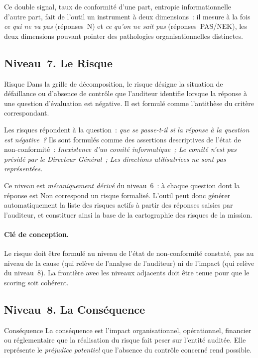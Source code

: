 Ce double signal, taux de conformité d'une part, entropie informationnelle
d'autre part, fait de l'outil un instrument à deux dimensions~: il mesure à
la fois \emph{ce qui ne va pas} (réponses~N) et \emph{ce qu'on ne sait pas}
(réponses~PAS/NEK), les deux dimensions pouvant pointer des pathologies
organisationnelles distinctes.

\subsection{Niveau~7. Le Risque}

\begin{boxdef}{Risque}
Dans la grille de décomposition, le risque désigne la situation de défaillance
ou d'absence de contrôle que l'auditeur identifie lorsque la réponse à une
question d'évaluation est négative. Il est formulé comme l'antithèse du critère
correspondant.
\end{boxdef}

Les risques répondent à la question~: \emph{que se passe-t-il si la réponse à
la question est négative~?} Ils sont formulés comme des assertions descriptives
de l'état de non-conformité~: \emph{Inexistence d'un comité informatique~; Le
comité n'est pas présidé par le Directeur Général~; Les directions utilisatrices
ne sont pas représentées.}

Ce niveau est \emph{mécaniquement dérivé} du niveau~6~: à chaque question dont
la réponse est Non correspond un risque formalisé. L'outil peut donc générer
automatiquement la liste des risques actifs à partir des réponses saisies par
l'auditeur, et constituer ainsi la base de la cartographie des risques de la
mission.

\paragraph{Clé de conception.}
Le risque doit être formulé au niveau de l'état de non-conformité constaté, pas
au niveau de la cause (qui relève de l'analyse de l'auditeur) ni de l'impact
(qui relève du niveau~8). La frontière avec les niveaux adjacents doit être
tenue pour que le scoring soit cohérent.

\subsection{Niveau~8. La Conséquence}

\begin{boxdef}{Conséquence}
La conséquence est l'impact organisationnel, opérationnel, financier ou
réglementaire que la réalisation du risque fait peser sur l'entité auditée.
Elle représente le \emph{préjudice potentiel} que l'absence du contrôle
concerné rend possible.
\end{boxdef}

